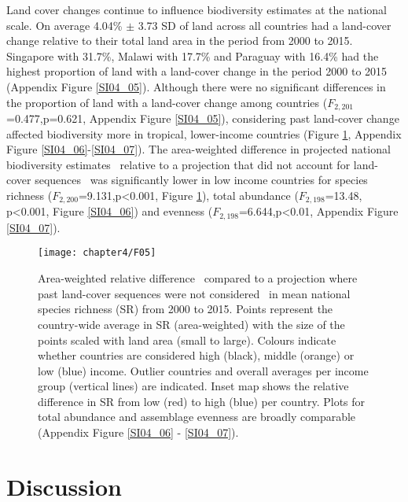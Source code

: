 Land cover changes continue to influence biodiversity estimates at the national scale. On average 4.04\% $\pm$ 3.73 SD of land across all countries had a land-cover change relative to their total land area in the period from 2000 to 2015. Singapore with 31.7\%, Malawi with 17.7\% and Paraguay with 16.4\% had the highest proportion of land with a land-cover change in the period 2000 to 2015 (Appendix Figure \ref{SI04_05}). Although there were no significant differences in the proportion of land with a land-cover change among countries ($F_{2,201}$=0.477,p=0.621, Appendix Figure \ref{SI04_05}), considering past land-cover change affected biodiversity more in tropical, lower-income countries (Figure \ref{F04_05}, Appendix Figure \ref{SI04_06}-\ref{SI04_07}). The area-weighted difference in projected national biodiversity estimates \textendash\ relative to a projection that did not account for land-cover sequences \textendash\ was significantly lower in low income countries for species richness ($F_{2,200}$=9.131,p<0.001, Figure \ref{F04_05}), total abundance ($F_{2,198}$=13.48, p<0.001, Figure \ref{SI04_06}) and evenness ($F_{2,198}$=6.644,p<0.01, Appendix Figure \ref{SI04_07}).

\begin{figure}[hb]
\centering
\texttt{[image: chapter4/F05]}
\caption{ Area-weighted relative difference \textendash\ compared to a projection where past land-cover sequences were not considered \textendash\ in mean national species richness (SR) from 2000 to 2015. Points represent the country-wide average in SR (area-weighted) with the size of the points scaled with land area (small to large). Colours indicate whether countries are considered high (black), middle (orange) or low (blue) income. Outlier countries and overall averages per income group (vertical lines) are indicated. Inset map shows the relative difference in SR from low (red) to high (blue) per country. Plots for total abundance and assemblage evenness are broadly comparable (Appendix Figure \ref{SI04_06} - \ref{SI04_07}). }
\label{F04_05}
\end{figure}

\section{Discussion}
\label{C04_04}

